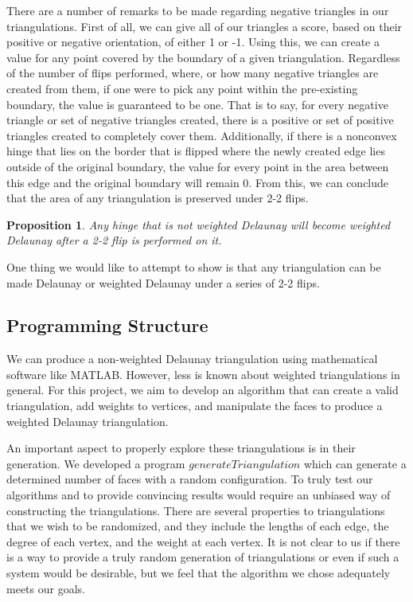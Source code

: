 \documentclass[12pt]{article}
\newtheorem{proposition}[theorem]{Proposition}
\begin{document}
\noindent There are a number of remarks to be made regarding negative triangles in our triangulations. First of all, we can give all of our triangles a score, based on their positive or negative orientation, of either 1 or -1. Using this, we can create a value for any point covered by the boundary of a given triangulation. Regardless of the number of flips performed, where, or how many negative triangles are created from them, if one were to pick any point within the pre-existing boundary, the value is guaranteed to be one. That is to say, for every negative triangle or set of negative triangles created, there is a positive or set of positive triangles created to completely cover them. Additionally, if there is a nonconvex hinge that lies on the border that is flipped where the newly created edge lies outside of the original boundary, the value for every point in the area between this edge and the original boundary will remain 0. From this, we can conclude that the area of any triangulation is preserved under 2-2 flips.\newline

\begin{proposition}
Any hinge that is not weighted Delaunay will become weighted Delaunay after a 2-2 flip is performed on it.
\end{proposition}

\noindent One thing we would like to attempt to show is that any triangulation can be made Delaunay or weighted Delaunay under a series of 2-2 flips.\newline

\subsection{Programming Structure}
\noindent We can produce a non-weighted Delaunay triangulation using mathematical software like MATLAB. However, less is known about weighted triangulations in general. For this project, we aim to develop an algorithm that can create a valid triangulation, add weights to vertices, and manipulate the faces to produce a weighted Delaunay triangulation.\newline

\noindent An important aspect to properly explore these triangulations is in their generation. We developed a program $generateTriangulation$ which can generate a determined number of faces with a random configuration. To truly test our algorithms and to provide convincing results would require an unbiased way of constructing the triangulations. There are several properties to triangulations that we wish to be randomized, and they include the lengths of each edge, the degree of each vertex, and the weight at each vertex. It is not clear to us if there is a way to provide a truly random generation of triangulations or even if such a system would be desirable, but we feel that the algorithm we chose adequately meets our goals.\newline
\end{document}
